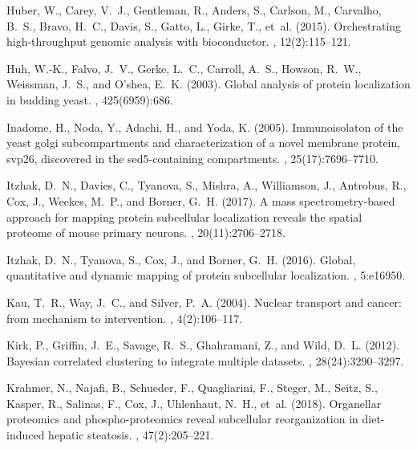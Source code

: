 \documentclass[12pt,english]{article}
\begin{document}
\begin{thebibliography}{}
Huber, W., Carey, V.~J., Gentleman, R., Anders, S., Carlson, M., Carvalho,
  B.~S., Bravo, H.~C., Davis, S., Gatto, L., Girke, T., et~al. (2015).
\newblock Orchestrating high-throughput genomic analysis with bioconductor.
, 12(2):115--121.

Huh, W.-K., Falvo, J.~V., Gerke, L.~C., Carroll, A.~S., Howson, R.~W.,
  Weissman, J.~S., and O'shea, E.~K. (2003).
\newblock Global analysis of protein localization in budding yeast.
, 425(6959):686.

Inadome, H., Noda, Y., Adachi, H., and Yoda, K. (2005).
\newblock Immunoisolaton of the yeast golgi subcompartments and
  characterization of a novel membrane protein, svp26, discovered in the
  sed5-containing compartments.
, 25(17):7696--7710.

Itzhak, D.~N., Davies, C., Tyanova, S., Mishra, A., Williamson, J., Antrobus,
  R., Cox, J., Weekes, M.~P., and Borner, G.~H. (2017).
\newblock A mass spectrometry-based approach for mapping protein subcellular
  localization reveals the spatial proteome of mouse primary neurons.
, 20(11):2706--2718.

Itzhak, D.~N., Tyanova, S., Cox, J., and Borner, G.~H. (2016).
\newblock Global, quantitative and dynamic mapping of protein subcellular
  localization.
, 5:e16950.

Kau, T.~R., Way, J.~C., and Silver, P.~A. (2004).
\newblock Nuclear transport and cancer: from mechanism to intervention.
, 4(2):106--117.

Kirk, P., Griffin, J.~E., Savage, R.~S., Ghahramani, Z., and Wild, D.~L.
  (2012).
\newblock Bayesian correlated clustering to integrate multiple datasets.
, 28(24):3290--3297.

Krahmer, N., Najafi, B., Schueder, F., Quagliarini, F., Steger, M., Seitz, S.,
  Kasper, R., Salinas, F., Cox, J., Uhlenhaut, N.~H., et~al. (2018).
\newblock Organellar proteomics and phospho-proteomics reveal subcellular
  reorganization in diet-induced hepatic steatosis.
, 47(2):205--221.


\end{thebibliography}
\end{document}
